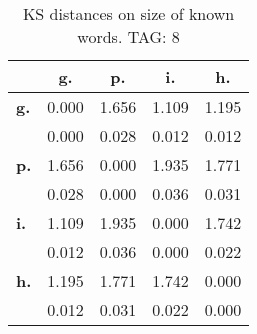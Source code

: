 \begin{table}[h!]
\begin{center}
\begin{tabular}{| l || c | c | c | c |}\hline
 & {\bf g.} & {\bf p.} & {\bf i.} & {\bf h.} \\\hline\hline
{\bf g.} & 0.000 & 1.656 & 1.109 & 1.195 \\
{\bf } & 0.000 & 0.028 & 0.012 & 0.012 \\\hline
{\bf p.} & 1.656 & 0.000 & 1.935 & 1.771 \\
{\bf } & 0.028 & 0.000 & 0.036 & 0.031 \\\hline
{\bf i.} & 1.109 & 1.935 & 0.000 & 1.742 \\
{\bf } & 0.012 & 0.036 & 0.000 & 0.022 \\\hline
{\bf h.} & 1.195 & 1.771 & 1.742 & 0.000 \\
{\bf } & 0.012 & 0.031 & 0.022 & 0.000 \\\hline
\end{tabular}
\caption{KS distances on size of known words. TAG: 8}
\end{center}
\end{table}